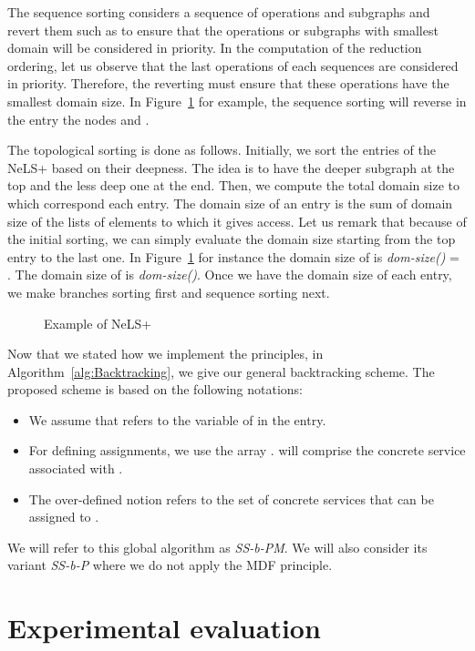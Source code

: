 \documentclass[a4paper]{article}
\begin{document}
The  sequence sorting considers a sequence of operations and subgraphs and revert them such as to ensure 
that the operations or subgraphs with smallest domain will be considered in priority. In the computation of the 
reduction ordering, let us observe that the last operations of each sequences are considered in priority. Therefore, 
the reverting must ensure that these operations have the smallest domain size. In Figure~\ref{transClosureExample} 
for example, the sequence sorting will reverse in the entry   the nodes  and . 

The topological sorting is done as follows. Initially, we sort the entries of the NeLS+ based on their deepness. 
The idea is to have the deeper subgraph at the top and the less deep one at the end. 
Then, we compute the total domain size to which correspond 
each entry. The domain size of an entry is the sum of domain size of the lists of elements to which 
it gives access. Let us remark that because of the initial sorting, we can simply evaluate the domain size starting from the 
top entry to the last one. In Figure~\ref{transClosureExample} for instance the domain size of  is {\it dom-size()} = . The domain size of  is  {\it dom-size()}. 
Once we have the domain size of each entry, we make branches sorting first and sequence sorting next. 

\begin{figure}[htbp]
\centering
{}
\caption{Example of NeLS+}\label{transClosureExample}
\end{figure}

Now that we stated how we implement the principles, in Algorithm~\ref{alg:Backtracking}, we give  
our general backtracking scheme. 
The proposed scheme is based on the following notations:
\begin{itemize}
\item  We assume that  refers to the variable of   in the  entry.
\item For defining assignments, we use the array .  will comprise the concrete service 
associated with .
\item The over-defined notion  refers to the set of concrete services that can be assigned to .
\end{itemize}

We will refer to this global algorithm as {\it SS-b-PM}. We will also consider its variant {\it SS-b-P} 
where we do not apply the MDF principle. 


\section{Experimental evaluation} \label{ExperimentalEvaluation}
\end{document}
